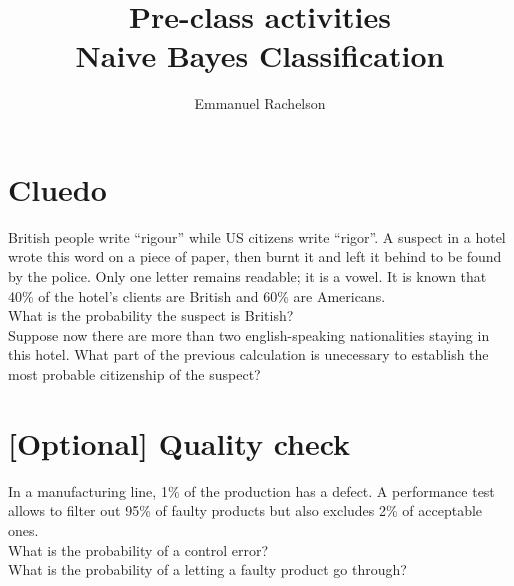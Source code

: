 \documentclass{article}
\author{Emmanuel Rachelson}
\title{Pre-class activities\\Naive Bayes Classification}
\date{}
\begin{document}
\maketitle

\section{Cluedo}

British people write ``rigour'' while US citizens write ``rigor''. A suspect in a hotel wrote this word on a piece of paper, then burnt it and left it behind to be found by the police. Only one letter remains readable; it is a vowel. It is known that 40\% of the hotel's clients are British and 60\% are Americans.\\
\noindent {} What is the probability the suspect is British?\\
\noindent {} Suppose now there are more than two english-speaking nationalities staying in this hotel. What part of the previous calculation is unecessary to establish the most probable citizenship of the suspect?

\section{[Optional] Quality check}

In a manufacturing line, 1\% of the production has a defect. A performance test allows to filter out 95\% of faulty products but also excludes 2\% of acceptable ones.\\
\noindent {} What is the probability of a control error?\\
\noindent {} What is the probability of a letting a faulty product go through?
\end{document}
